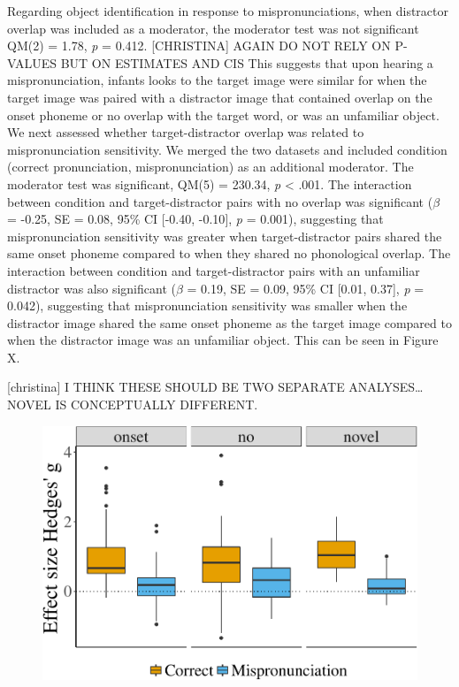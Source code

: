 \documentclass[man]{apa6}
\theoremstyle{definition}
\theoremstyle{definition}
\theoremstyle{definition}
\theoremstyle{remark}
\begin{document}
Regarding object identification in response to mispronunciations, when
distractor overlap was included as a moderator, the moderator test was
not significant QM(2) = 1.78, \emph{p} = 0.412. {[}CHRISTINA{]} AGAIN DO
NOT RELY ON P-VALUES BUT ON ESTIMATES AND CIS This suggests that upon
hearing a mispronunciation, infants looks to the target image were
similar for when the target image was paired with a distractor image
that contained overlap on the onset phoneme or no overlap with the
target word, or was an unfamiliar object. We next assessed whether
target-distractor overlap was related to mispronunciation sensitivity.
We merged the two datasets and included condition (correct
pronunciation, mispronunciation) as an additional moderator. The
moderator test was significant, QM(5) = 230.34, \emph{p} \textless{}
.001. The interaction between condition and target-distractor pairs with
no overlap was significant (\(\beta\) = -0.25, SE = 0.08, 95\% CI
{[}-0.40, -0.10{]}, \emph{p} = 0.001), suggesting that mispronunciation
sensitivity was greater when target-distractor pairs shared the same
onset phoneme compared to when they shared no phonological overlap. The
interaction between condition and target-distractor pairs with an
unfamiliar distractor was also significant (\(\beta\) = 0.19, SE = 0.09,
95\% CI {[}0.01, 0.37{]}, \emph{p} = 0.042), suggesting that
mispronunciation sensitivity was smaller when the distractor image
shared the same onset phoneme as the target image compared to when the
distractor image was an unfamiliar object. This can be seen in Figure X.

{[}christina{]} I THINK THESE SHOULD BE TWO SEPARATE ANALYSES\ldots{}
NOVEL IS CONCEPTUALLY DIFFERENT.

\begin{figure}[htbp]
\centering
\includegraphics{Paper_Analyses_files/figure-latex/PlotDistOverlapEffect-1.pdf}
\caption{}
\end{figure}
\end{document}
